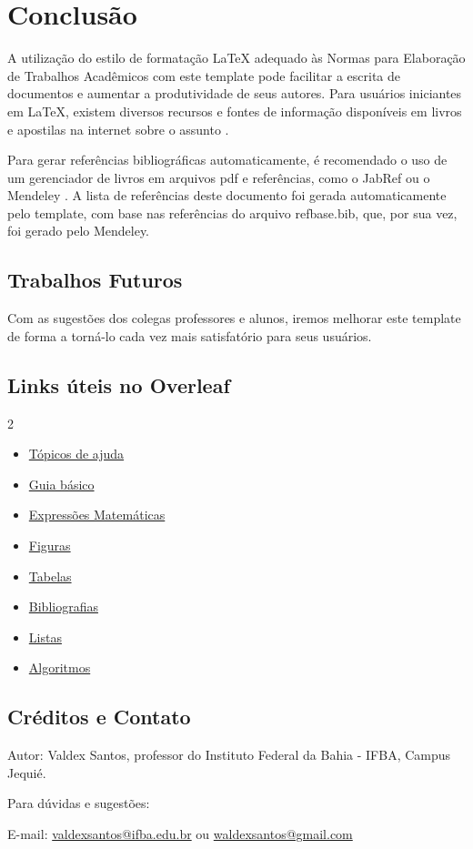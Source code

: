 %
\chapter{Conclusão}\label{chap:conclusao}
A utilização do estilo de formatação LaTeX adequado às Normas para Elaboração de Trabalhos Acadêmicos com este template pode facilitar a escrita de documentos e aumentar a produtividade de seus autores. Para usuários iniciantes em LaTeX, existem diversos recursos e fontes de informação disponíveis em livros e apostilas na internet sobre o assunto \cite{CTAN214, Wikibooks14}.

Para gerar referências bibliográficas automaticamente, é recomendado o uso de um gerenciador de livros em arquivos pdf e referências, como o JabRef \cite{JabRef} ou o Mendeley \cite{Mendeley}. A lista de referências deste documento foi gerada automaticamente pelo template, com base nas referências do arquivo {\ttfamily refbase.bib}, que, por sua vez, foi gerado pelo Mendeley.

\section{Trabalhos Futuros}
\label{sec:trabalhosFuturos}
Com as sugestões dos colegas professores e alunos, iremos melhorar este template de forma a torná-lo cada vez mais satisfatório para seus usuários.

\section{Links úteis no Overleaf}
\begin{multicols}{2}
\begin{itemize}
\item \href{https://pt.overleaf.com/learn/latex/Main_Page}{Tópicos de ajuda}
\item \href{https://pt.overleaf.com/learn/how-to/Creating_a_document_in_Overleaf}{Guia básico}
\item \href{https://pt.overleaf.com/learn/latex/Mathematical_expressions}{Expressões Matemáticas}
\item \href{https://pt.overleaf.com/learn/latex/Inserting_Images}{Figuras}
    \item \href{https://pt.overleaf.com/learn/latex/Tables}{Tabelas}
    \item \href{https://pt.overleaf.com/learn/latex/Bibliography_management_in_LaTeX}{Bibliografias}
    \item \href{https://pt.overleaf.com/learn/latex/Lists}{Listas}
    \item \href{https://pt.overleaf.com/learn/latex/Algorithms}{ Algoritmos}
    \end{itemize}
\end{multicols}
\section{Créditos e Contato}\label{sec:contatos}
 Autor:  Valdex Santos, professor do Instituto Federal da Bahia - IFBA, Campus Jequié.
 
Para dúvidas e sugestões:

E-mail: \href{valdexsantos@ifba.edu.br}{valdexsantos@ifba.edu.br} ou \href{waldexsantos@gmail.com}{waldexsantos@gmail.com}\\

